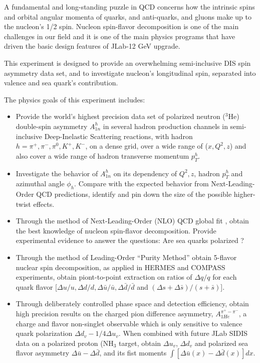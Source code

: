 A fundamental and long-standing puzzle in QCD concerns how the intrinsic spins and orbital angular momenta of quarks, and anti-quarks, and gluons make up to the nucleon's 1/2 spin.  Nucleon spin-flavor decomposition is one of the main challenges in our field and  it is one of the main physics programs that have driven the basic design features of JLab-12 GeV upgrade.

This experiment is designed to provide an overwhelming semi-inclusive DIS spin asymmetry data set,  and to investigate nucleon's longitudinal spin, separated into valence and sea quark's contribution.   

The physics goals of this experiment includes:

\begin{itemize}
\item {Provide the world's highest precision data set of polarized neutron ($^3$He) double-spin asymmetry $A_{1n}^h$ in several hadron production channels in semi-inclusive Deep-Inelastic Scattering reactions, with hadron $h=\pi^+, \pi^-, \pi^0, K^+, K^-$,  on a dense grid, over a wide range of ($x, Q^2, z$) and also cover a wide range of hadron transverse momentum $p_T^h$.}    

\item {Investigate the behavior of  $A_{1n}^h$  on its dependency of $Q^2, z$, hadron $p_T^h$ and azimuthal angle $\phi_h$. Compare with the expected behavior from Next-Leading-Order  QCD predictions, identify and pin down the size of the possible higher-twist effects.}

\item { Through the method of Next-Leading-Order (NLO)  QCD global fit , obtain the best knowledge of nucleon spin-flavor decomposition.  Provide experimental evidence to  answer the questions: Are sea quarks polarized ?}

\item { Through the method of Leading-Order ``Purity Method'' obtain 5-flavor nuclear spin decomposition,  as applied in HERMES and COMPASS experiments, obtain piont-to-point extraction on ratios of  $\Delta q/q$ for each quark flavor [$\Delta u/u, \Delta d/d, \Delta \bar{u}/\bar{u},  \Delta \bar{d}/\bar{d}$    and $ (\Delta s+\Delta \bar{s})/(s+\bar{s})$]. }  

\item { Through deliberately  controlled phase space and detection efficiency, obtain high precision results on the charged pion difference asymmetry, $A_{1He}^{\pi^+-\pi^-}$, a charge and flavor non-singlet observable which is only sensitive to valence quark polarization $\Delta d_v - 1/4 \Delta u_v$.  When combined with future JLab  SIDIS data on a polarized proton (NH$_3$ target,  obtain $\Delta u_v$, $\Delta d_v$ and polarized sea flavor asymmetry $\Delta \bar{u}-\Delta \bar{d}$, and its fist moments  $\int  [\Delta \bar{u}(x)-\Delta \bar{d}(x)] dx$. } 


\end{itemize}

